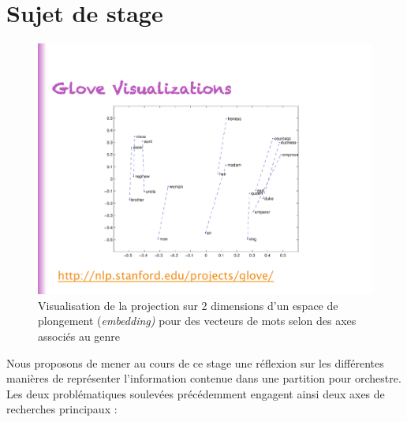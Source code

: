 \documentclass[a4paper, 10pt]{article} %
\begin{document}
\section*{Sujet de stage}
\begin{figure}
\begin{center}
\includegraphics[scale=0.4]{../word_embedding.pdf}
\caption{Visualisation de la projection sur 2 dimensions d'un espace de plongement (\textit{embedding)} pour des vecteurs de mots selon des axes associés au genre \cite{pennington2014glove}}
\label{fig:word-embedding}
\end{center}
\end{figure}
Nous proposons de mener au cours de ce stage une réflexion sur les différentes manières de représenter l'information contenue dans une partition pour orchestre. Les deux problématiques soulevées précédemment engagent ainsi deux axes de recherches principaux :
\end{document}
